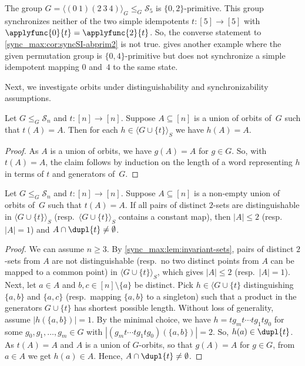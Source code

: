 	\begin{example}\label{sync_max:ex:abprim-no-constant}
		The group $G = \langle (0 ~ 1)(2 ~ 3 ~ 4) \rangle_G \le_G \mathcal S_5$
		is $\{0,2\}$-primitive.
		This group synchronizes neither of the
		two simple idempotents $t \colon [5] \to [5]$
		with $\applyfunc{0}{t} = \applyfunc{2}{t}$.
		So, the converse statement to 
		\cref{sync_max:cor:syncSI-abprim2}
		is not true. 
		gives another example where the given permutation group is $\{0,4\}$-primitive
		but does not synchronize a simple idempotent mapping $0$ and~$4$
		to the same state.		
	\end{example}
			
	Next, we investigate orbits under distinguishability and synchronizability assumptions.
	
	\begin{lemma} \label{sync_max:lem:invariant-sets}
		Let $G \le_G \mathcal S_n$ and $t \colon [n] \to [n]$.
		Suppose $A \subseteq [n]$
		is a union of orbits of~$G$
		such that $t(A) = A$.
		Then for each $h \in \langle G \cup \{t\} \rangle_S$
		we have $h(A) = A$.
	\end{lemma}
	\begin{proof}
		As $A$ is a union of orbits, we have $g(A) = A$
		for $g \in G$. So, with $t(A) = A$,
		the claim follows  by induction on the length of a word representing $h$
		in terms of $t$ and generators of~$G$.
	\end{proof}
	
	\begin{lemma} \label{sync_max:lem:invariant-set-dist-sync}
		Let $G \le_G \mathcal S_n$ and
		$t \colon [n] \to [n]$.
		Suppose $A \subseteq [n]$
		is a non-empty union of orbits of~$G$
		such that $t(A) = A$.
		If all pairs of distinct $2$-sets are distinguishable in $\langle G \cup \{t\} \rangle_S$ (resp.~$\langle G \cup \{t\} \rangle_S$ contains
		a constant map), then $|A| \le 2$ (resp.~$|A| = 1$)
		and $A \cap \dupl{t} \ne \emptyset$.
	\end{lemma}
	\begin{proof}
		We can assume $n \ge 3$.
		By \cref{sync_max:lem:invariant-sets}, 
		pairs of distinct $2$-sets
		from $A$ are not distinguishable (resp.~no two distinct points from $A$ can be mapped to a common point)  in $\langle G \cup \{t\} \rangle_S$,
		which gives $|A| \le 2$ (resp.~$|A| = 1$).
		Next, let $a \in A$ and $b,c \in [n] \setminus \{a\}$ be distinct.
		Pick $h \in \langle G \cup \{t\}$ 
		distinguishing $\{a,b\}$ and $\{a,c\}$ (resp.~mapping $\{a,b\}$ to a singleton)
		such that a product	in the generators $G \cup \{t\}$
		has shortest possible length.
		Without loss of generality, assume $|h(\{a,b\})| = 1$.
		By the minimal choice, we have
		$h = t g_{m} t \cdots t g_1 t g_0$
		for some $g_0, g_1, \ldots, g_m \in G$
		with $|(g_m t \cdots t g_1 t g_0)(\{a,b\})| = 2$.
		So, $h(a) \in \dupl{t}$.
		As $t(A) = A$ and $A$ is a union of $G$-orbits,
		so that $g(A) = A$ for $g \in G$, from $a \in A$ we get $h(a) \in A$.
		Hence, $A \cap \dupl{t} \ne \emptyset$.
	\end{proof}
	
